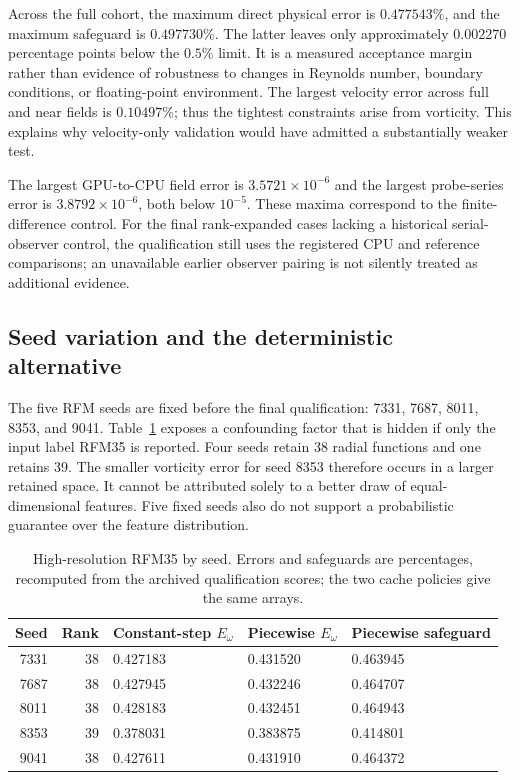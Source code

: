 Across the full cohort, the maximum direct physical error is $0.477543\%$, and the maximum safeguard is $0.497730\%$. The latter leaves only approximately $0.002270$ percentage points below the $0.5\%$ limit. It is a measured acceptance margin rather than evidence of robustness to changes in Reynolds number, boundary conditions, or floating-point environment. The largest velocity error across full and near fields is $0.10497\%$; thus the tightest constraints arise from vorticity. This explains why velocity-only validation would have admitted a substantially weaker test.

The largest GPU-to-CPU field error is $3.5721\times10^{-6}$ and the largest probe-series error is $3.8792\times10^{-6}$, both below $10^{-5}$. These maxima correspond to the finite-difference control. For the final rank-expanded cases lacking a historical serial-observer control, the qualification still uses the registered CPU and reference comparisons; an unavailable earlier observer pairing is not silently treated as additional evidence.

\subsection{Seed variation and the deterministic alternative}

The five RFM seeds are fixed before the final qualification: 7331, 7687, 8011, 8353, and 9041. Table~\ref{tab:seeds} exposes a confounding factor that is hidden if only the input label RFM35 is reported. Four seeds retain 38 radial functions and one retains 39. The smaller vorticity error for seed 8353 therefore occurs in a larger retained space. It cannot be attributed solely to a better draw of equal-dimensional features. Five fixed seeds also do not support a probabilistic guarantee over the feature distribution.

\begin{table}[tbp]
\centering\small
\caption{High-resolution RFM35 by seed. Errors and safeguards are percentages, recomputed from the archived qualification scores; the two cache policies give the same arrays.}
\label{tab:seeds}
\begin{tabularx}{\linewidth}{@{}rrXXX@{}}
\toprule
Seed & Rank & Constant-step $E_\omega$ & Piecewise $E_\omega$ & Piecewise safeguard \\
\midrule
7331 & 38 & 0.427183 & 0.431520 & 0.463945 \\
7687 & 38 & 0.427945 & 0.432246 & 0.464707 \\
8011 & 38 & 0.428183 & 0.432451 & 0.464943 \\
8353 & 39 & 0.378031 & 0.383875 & 0.414801 \\
9041 & 38 & 0.427611 & 0.431910 & 0.464372 \\
\bottomrule
\end{tabularx}
\end{table}

